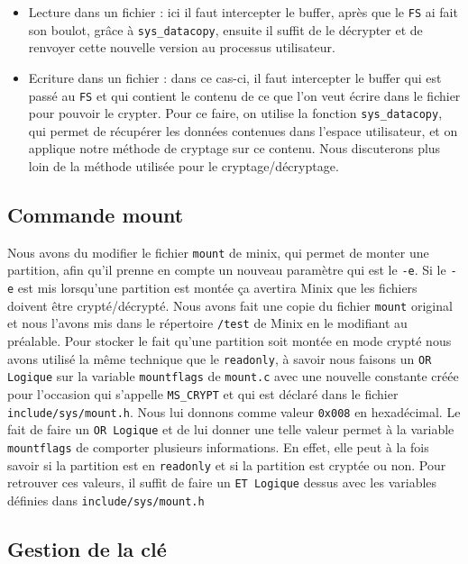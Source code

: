\documentclass[10pt, onecolumn] {IEEEtran}
\begin{document}
\begin{itemize}
\item Lecture dans un fichier : ici il faut intercepter le buffer, après que le \texttt{FS} ai fait son boulot, grâce à \texttt{sys\_datacopy}, ensuite il suffit de le décrypter et de renvoyer cette nouvelle version au processus utilisateur.
\item Ecriture dans un fichier : dans ce cas-ci, il faut intercepter le buffer qui est passé au \texttt{FS} et qui contient le contenu de ce que l'on veut écrire dans le fichier pour pouvoir le crypter. Pour ce faire, on utilise la fonction \texttt{sys\_datacopy}, qui permet de récupérer les données contenues dans l'espace utilisateur, et on applique notre méthode de cryptage sur ce contenu. Nous discuterons plus loin de la méthode utilisée pour le cryptage/décryptage.
\end{itemize}

\subsection{Commande mount}

Nous avons du modifier le fichier \texttt{mount} de minix, qui permet de monter une partition, afin qu'il prenne en compte un nouveau paramètre qui est le \texttt{-e}. Si le \texttt{-e} est mis lorsqu'une partition est montée ça avertira Minix que les fichiers doivent être crypté/décrypté.
Nous avons fait une copie du fichier \texttt{mount} original et nous l'avons mis dans le répertoire \texttt{/test} de Minix en le modifiant au préalable.
Pour stocker le fait qu'une partition soit montée en mode crypté nous avons utilisé la même technique que le \texttt{readonly}, à savoir nous faisons un \texttt{OR Logique} sur la variable \texttt{mountflags} de \texttt{mount.c} avec une nouvelle constante créée pour l'occasion qui s'appelle \texttt{MS\_CRYPT} et qui est déclaré dans le fichier \texttt{include/sys/mount.h}. Nous lui donnons comme valeur \texttt{0x008} en hexadécimal.
Le fait de faire un \texttt{OR Logique} et de lui donner une telle valeur permet à la variable \texttt{mountflags} de comporter plusieurs informations. En effet, elle peut à la fois savoir si la partition est en \texttt{readonly} et si la partition est cryptée ou non. Pour retrouver ces valeurs, il suffit de faire un \texttt{ET Logique} dessus avec les variables définies dans \texttt{include/sys/mount.h}

\subsection{Gestion de la clé}
\end{document}
